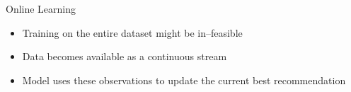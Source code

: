 \begin{frame}{Online Learning}
    \begin{itemize}
        \item Training on the entire dataset might be in--feasible
        \item Data becomes available as a continuous stream 
        \item Model uses these observations to update the current best recommendation
    \end{itemize}
\end{frame}